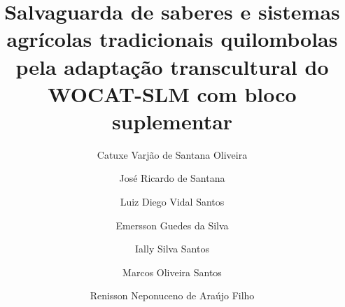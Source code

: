 \documentclass[preprint,authoryear,12pt]{elsarticle}
\begin{document}

\begin{frontmatter}



\title{Salvaguarda de saberes e sistemas agrícolas tradicionais quilombolas pela adaptação transcultural do WOCAT-SLM com bloco suplementar}

\author[a]{Catuxe Varjão de Santana Oliveira}
\author[a]{José Ricardo de Santana}
\author[b]{Luiz Diego Vidal Santos}
\author[c]{Emersson Guedes da Silva}
\author[c]{Ially Silva Santos}
\author[c]{Marcos Oliveira Santos}
\author[d]{Renisson Neponuceno de Araújo Filho}


\address[a]{Programa de Pós-Graduação em Ciência da Propriedade Intelectual (PPGPI), Universidade Federal de Sergipe (UFS), São Cristóvão, SE, Brasil}
\address[b]{Universidade Estadual de Feira de Santana (UEFS), Feira de Santana, BA, Brasil}
\address[c]{Universidade Federal de Sergipe (UFS), São Cristóvão, SE, Brasil}
\address[d]{Departamento de Tecnologia Rural, Universidade Federal Rural de Pernambuco (UFRPE), Recife, PE, Brasil}
\address[e]{Departamento de Engenharia Agronômica, Universidade Federal de Sergipe (UFS), São Cristóvão, SE, Brasil}


\end{frontmatter}
\end{document}
